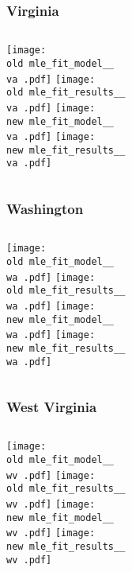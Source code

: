\documentclass{beamer}
\newcommand{\old}{api-370-prod/pyseir/state_summaries/reports/}
\newcommand{\new}{new/pyseir/state_summaries/reports/}
\newcommand{\va}{Virginia__51}
\newcommand{\wa}{Washington__53}
\newcommand{\wv}{West Virginia__54}
\begin{document}
\begin{frame}
\frametitle{Virginia}
    \begin{columns}[t]
       \texttt{[image: \\old mle\_fit\_model\_\_\\va .pdf]}
       \texttt{[image: \\old mle\_fit\_results\_\_\\va .pdf]}   
       \texttt{[image: \\new mle\_fit\_model\_\_\\va .pdf]}
       \texttt{[image: \\new mle\_fit\_results\_\_\\va .pdf]}   
\end{columns}
\end{frame}


\begin{frame}
\frametitle{Washington}
    \begin{columns}[t]
       \texttt{[image: \\old mle\_fit\_model\_\_\\wa .pdf]}
       \texttt{[image: \\old mle\_fit\_results\_\_\\wa .pdf]}   
       \texttt{[image: \\new mle\_fit\_model\_\_\\wa .pdf]}
       \texttt{[image: \\new mle\_fit\_results\_\_\\wa .pdf]}   
\end{columns}
\end{frame}

\begin{frame}
\frametitle{West Virginia}
    \begin{columns}[t]
       \texttt{[image: \\old mle\_fit\_model\_\_\\wv .pdf]}
       \texttt{[image: \\old mle\_fit\_results\_\_\\wv .pdf]}   
       \texttt{[image: \\new mle\_fit\_model\_\_\\wv .pdf]}
       \texttt{[image: \\new mle\_fit\_results\_\_\\wv .pdf]}   
\end{columns}
\end{frame}
\end{document}
